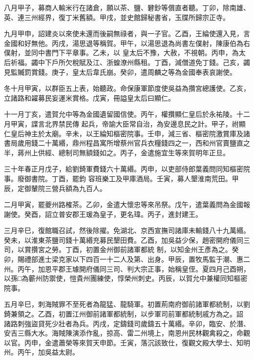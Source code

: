 \begin{pinyinscope}
 八月甲子，募商人輸米行在諸倉，願以茶、鹽、礬鈔等償直者聽。丁卯，除南雄、英、連三州經界，復丁米舊額。甲戌，並史館歸秘書省，玉牒所歸宗正寺。



 九月甲申，詔建炎以來使未還而後嗣無祿者，與一子官。乙酉，王綸使還入見，言金國和好無他。丙戌，湯思退等稱賀。甲午，以湯思退為尚書左僕射，陳康伯為右僕射，並同中書門下平章事。乙未，以
 皇太后不豫，大赦，不視朝。丙申，為太后祈福。蠲中下戶所欠稅賦及江、浙蝗潦州縣租。丁酉，減僧道免丁錢。己亥，蠲見監贓罰賞錢。庚子，皇太后韋氏崩。癸卯，遣周麟之等為金國奉表哀謝使。



 冬十月甲寅，以群臣五上表，始聽政。命保康軍節度使吳益為攢宮總護使。乙亥，立諸路和糴募民妄運米賞格。戊寅，冊謚皇太后曰顯仁。



 十一月丁亥，遣賀允中等為金國遺留國信使。丙午，權攢顯仁皇后於永祐陵。十二月甲寅，諜言北界禁民傳
 起兵，帝諭大臣常自治，為安邊息民之計。甲子，祔顯仁皇后神主於太廟。辛未，以王綸知樞密院事。壬申，減三省、樞密院激賞庫及諸書局歲用錢二十萬緡，鼎州程昌寓所增蔡州官兵衣糧錢四之一，西和州官賣鹽直之半，蔣州上供經、總制司無額錢如之。丙子，金遣施宜生等來賀明年正旦。



 三十年春正月戊子，給劉錡軍費錢六十萬緡。丙申，以吏部侍郎葉義問同知樞密院事。廢御書院。丁酉，罷鈞
 容班樂工及甲庫酒局。壬寅，募人墾淮南荒田。甲辰，定御輦院三營兵額為九百人。



 二月甲寅，罷夔州路榷茶。乙卯，金遣大懷忠等來吊祭。戊午，遣葉義問為金國報謝使。癸酉，詔立普安郡王瑗為皇子，更名瑋。丙子，進封建王。



 三月辛巳，復館職召試，然後除擢。免湖北、京西宣撫司諸庫未輸錢八十九萬緡。癸未，以淮東茶鹽司錢十萬緡充募民墾田費。乙酉，加吳益少保，趙密開府儀同三司，以賞攢宮之勞。丁酉，初置金州御前諸軍都統
 制，以知金州王彥為之。癸卯，賜禮部進士梁克家以下四百一十二人及第、出身。甲辰，置牧馬監于潮、惠二州。丙午，加恩平郡王璩開府儀同三司、判大宗正事，始稱皇侄。夏四月己酉朔，以孫□為蘄州防禦使，愷貴州團練使，惇榮州刺史。丙辰，以賀允中兼權同知樞密院事。



 五月辛巳，刺海賊罪不至死者為龍猛、龍騎軍。初置荊南府御前諸軍都統制，以劉錡兼領之。乙酉，初置江州御前諸軍都統制，以步軍司前軍都統制戚方為之。詔
 諸路刺強盜貸死少壯者為兵。丙戌，定鑄錢司歲鑄五十萬緡。辛卯，臨安、於潛、安吉三縣大水。海賊陳演添作亂，掠高、雷二州境上，南恩州民林觀禽殺之，命觀以官。丙申，金遣蕭榮等來賀天申節。壬寅，落沉該致仕，復觀文殿大學士、知明州。丙午，加吳益太尉。




\end{pinyinscope}
